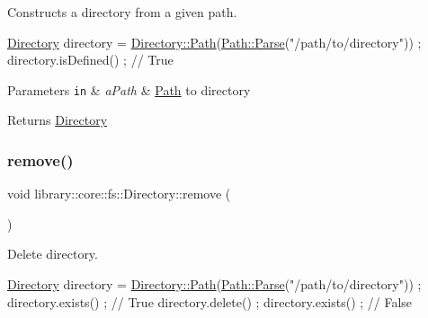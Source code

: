 Constructs a directory from a given path. 


\begin{DoxyCode}
\hyperlink{classlibrary_1_1core_1_1fs_1_1_directory_a3ec39f6cad19a81d520e9a1f2d8bb1f7}{Directory} directory = \hyperlink{classlibrary_1_1core_1_1fs_1_1_directory_a6d3ea04654841e62a4dbd99feb563caf}{Directory::Path}(\hyperlink{classlibrary_1_1core_1_1fs_1_1_path_a6ba644b6609507e724c217bf2020f5ae}{Path::Parse}(\textcolor{stringliteral}{"/path/to/directory"}))
       ;
directory.isDefined() ; \textcolor{comment}{// True}
\end{DoxyCode}



\begin{DoxyParams}[1]{Parameters}
\mbox{\tt in}  & {\em a\+Path} & \hyperlink{classlibrary_1_1core_1_1fs_1_1_path}{Path} to directory \\
\hline
\end{DoxyParams}
\begin{DoxyReturn}{Returns}
\hyperlink{classlibrary_1_1core_1_1fs_1_1_directory}{Directory} 
\end{DoxyReturn}
\mbox{\label{classlibrary_1_1core_1_1fs_1_1_directory_a8392a637e3b8cc07f55c0bc2850fb42b}} 
\subsubsection{\texorpdfstring{remove()}{remove()}}
{\footnotesize\ttfamily void library\+::core\+::fs\+::\+Directory\+::remove (\begin{DoxyParamCaption}{ }\end{DoxyParamCaption})}



Delete directory. 


\begin{DoxyCode}
\hyperlink{classlibrary_1_1core_1_1fs_1_1_directory_a3ec39f6cad19a81d520e9a1f2d8bb1f7}{Directory} directory = \hyperlink{classlibrary_1_1core_1_1fs_1_1_directory_a6d3ea04654841e62a4dbd99feb563caf}{Directory::Path}(\hyperlink{classlibrary_1_1core_1_1fs_1_1_path_a6ba644b6609507e724c217bf2020f5ae}{Path::Parse}(\textcolor{stringliteral}{"/path/to/directory"}))
       ;
directory.exists() ; \textcolor{comment}{// True}
directory.delete() ;
directory.exists() ; \textcolor{comment}{// False}
\end{DoxyCode}
 \mbox{\label{classlibrary_1_1core_1_1fs_1_1_directory_abc9c7c9f9129950cd89c9dbd77978b8f}} 

